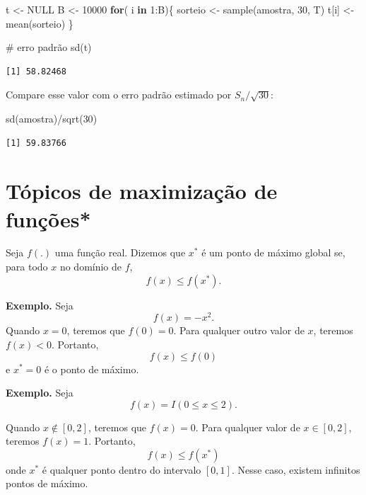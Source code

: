 \documentclass[
  letterpaper,
  DIV=11,
  numbers=noendperiod]{scrartcl}
\newenvironment{Shaded}{\begin{snugshade}}{\end{snugshade}}
\newcommand{\CommentTok}[1]{\textcolor[rgb]{0.37,0.37,0.37}{#1}}
\newcommand{\ConstantTok}[1]{\textcolor[rgb]{0.56,0.35,0.01}{#1}}
\newcommand{\ControlFlowTok}[1]{\textcolor[rgb]{0.00,0.23,0.31}{\textbf{#1}}}
\newcommand{\DecValTok}[1]{\textcolor[rgb]{0.68,0.00,0.00}{#1}}
\newcommand{\FunctionTok}[1]{\textcolor[rgb]{0.28,0.35,0.67}{#1}}
\newcommand{\NormalTok}[1]{\textcolor[rgb]{0.00,0.23,0.31}{#1}}
\newcommand{\OtherTok}[1]{\textcolor[rgb]{0.00,0.23,0.31}{#1}}
\newcommand{\SpecialCharTok}[1]{\textcolor[rgb]{0.37,0.37,0.37}{#1}}
\begin{document}
\begin{Shaded}
\begin{Highlighting}[]
\NormalTok{t }\OtherTok{\textless{}{-}} \ConstantTok{NULL}
\NormalTok{B }\OtherTok{\textless{}{-}} \DecValTok{10000}
\ControlFlowTok{for}\NormalTok{( i }\ControlFlowTok{in} \DecValTok{1}\SpecialCharTok{:}\NormalTok{B)\{ }
\NormalTok{sorteio }\OtherTok{\textless{}{-}} \FunctionTok{sample}\NormalTok{(amostra, }\DecValTok{30}\NormalTok{, T)}
\NormalTok{t[i] }\OtherTok{\textless{}{-}} \FunctionTok{mean}\NormalTok{(sorteio)}
\NormalTok{\}}

\CommentTok{\# erro padrão}
\FunctionTok{sd}\NormalTok{(t)}
\end{Highlighting}
\end{Shaded}

\begin{verbatim}
[1] 58.82468
\end{verbatim}

Compare esse valor com o erro padrão estimado por \(S_n/\sqrt{30}\):

\begin{Shaded}
\begin{Highlighting}[]
\FunctionTok{sd}\NormalTok{(amostra)}\SpecialCharTok{/}\FunctionTok{sqrt}\NormalTok{(}\DecValTok{30}\NormalTok{)}
\end{Highlighting}
\end{Shaded}

\begin{verbatim}
[1] 59.83766
\end{verbatim}

\section{Tópicos de maximização de
funções*}\label{tuxf3picos-de-maximizauxe7uxe3o-de-funuxe7uxf5es}

Seja \(f(.)\) uma função real. Dizemos que \(x^*\) é um ponto de máximo
global se, para todo \(x\) no domínio de \(f\), \[f(x)\leq f(x^*).\]

\textbf{Exemplo.} Seja \[f(x)= -x^2.\] Quando \(x=0\), teremos que
\(f(0)=0\). Para qualquer outro valor de \(x\), teremos \(f(x)<0\).
Portanto, \[f(x)\leq f(0)\] e \(x^*=0\) é o ponto de máximo.

\textbf{Exemplo.} Seja \[f(x)= I(0\leq x \leq 2).\]

Quando \(x\notin[0,2]\), teremos que \(f(x)=0\). Para qualquer valor de
\(x\in[0,2]\), teremos \(f(x)=1\). Portanto, \[f(x)\leq f(x^*)\] onde
\(x^*\) é qualquer ponto dentro do intervalo \([0,1]\). Nesse caso,
existem infinitos pontos de máximo.
\end{document}
